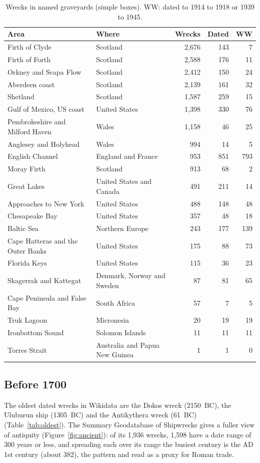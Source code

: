 \documentclass[11pt,a4paper]{article}
\begin{document}
\begin{table}[tbp]\centering\small\caption{Wrecks in named graveyards (simple boxes). WW: dated to 1914 to 1918 or 1939 to 1945.}\label{tab:gy}\begin{tabular}{llrrr}\toprule Area & Where & Wrecks & Dated & WW\\\midrule
Firth of Clyde & Scotland & 2,676 & 143 & 7\\
Firth of Forth & Scotland & 2,588 & 176 & 11\\
Orkney and Scapa Flow & Scotland & 2,412 & 150 & 24\\
Aberdeen coast & Scotland & 2,139 & 161 & 32\\
Shetland & Scotland & 1,587 & 259 & 15\\
Gulf of Mexico, US coast & United States & 1,398 & 330 & 76\\
Pembrokeshire and Milford Haven & Wales & 1,158 & 46 & 25\\
Anglesey and Holyhead & Wales & 994 & 14 & 5\\
English Channel & England and France & 953 & 851 & 793\\
Moray Firth & Scotland & 913 & 68 & 2\\
Great Lakes & United States and Canada & 491 & 211 & 14\\
Approaches to New York & United States & 488 & 148 & 48\\
Chesapeake Bay & United States & 357 & 48 & 18\\
Baltic Sea & Northern Europe & 243 & 177 & 139\\
Cape Hatteras and the Outer Banks & United States & 175 & 88 & 73\\
Florida Keys & United States & 115 & 36 & 23\\
Skagerrak and Kattegat & Denmark, Norway and Sweden & 87 & 81 & 65\\
Cape Peninsula and False Bay & South Africa & 57 & 7 & 5\\
Truk Lagoon & Micronesia & 20 & 19 & 19\\
Ironbottom Sound & Solomon Islands & 11 & 11 & 11\\
Torres Strait & Australia and Papua New Guinea & 1 & 1 & 0\\
\bottomrule\end{tabular}\end{table}

\subsection{Before 1700}
The oldest dated wrecks in Wikidata are the Dokos wreck (2150~BC), the Uluburun ship (1305~BC) and the Antikythera wreck (61~BC) (Table~\ref{tab:oldest}). The Summary Geodatabase of Shipwrecks gives a fuller view of antiquity (Figure~\ref{fig:ancient}): of its 1,936 wrecks, 1,598 have a date range of 300 years or less, and spreading each over its range the busiest century is the AD 1st century (about 382), the pattern \citet{parker} and \citet{wilson} read as a proxy for Roman trade.
\end{document}
